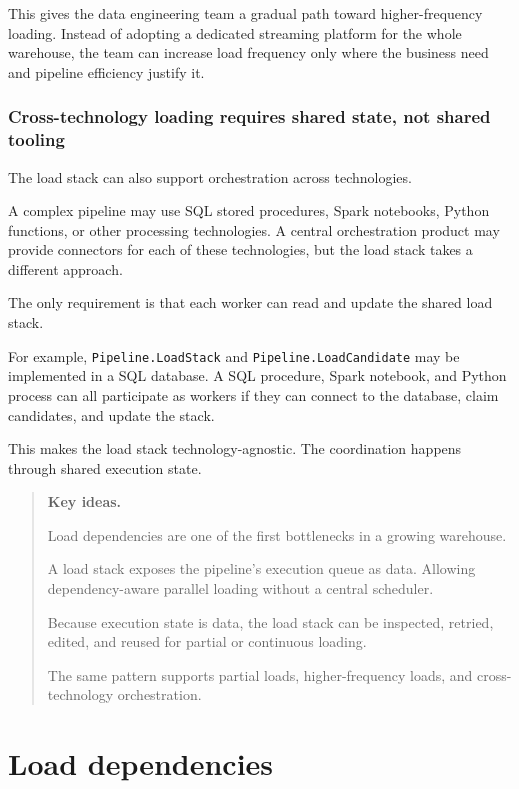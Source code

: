 \documentclass[10pt,openany,10pt]{book}
\begin{document}
This gives the data engineering team a gradual path toward
higher-frequency loading. Instead of adopting a dedicated streaming
platform for the whole warehouse, the team can increase load frequency
only where the business need and pipeline efficiency justify it.

\subsection{Cross-technology loading requires shared state, not shared
tooling}\label{cross-technology-loading-requires-shared-state-not-shared-tooling}

The load stack can also support orchestration across technologies.

A complex pipeline may use SQL stored procedures, Spark notebooks,
Python functions, or other processing technologies. A central
orchestration product may provide connectors for each of these
technologies, but the load stack takes a different approach.

The only requirement is that each worker can read and update the shared
load stack.

For example, \texttt{Pipeline.LoadStack} and
\texttt{Pipeline.LoadCandidate} may be implemented in a SQL database. A
SQL procedure, Spark notebook, and Python process can all participate as
workers if they can connect to the database, claim candidates, and
update the stack.

This makes the load stack technology-agnostic. The coordination happens
through shared execution state.

\begin{quote}
\textbf{Key ideas.}

Load dependencies are one of the first bottlenecks in a growing
warehouse.

A load stack exposes the pipeline's execution queue as data. Allowing
dependency-aware parallel loading without a central scheduler.

Because execution state is data, the load stack can be inspected,
retried, edited, and reused for partial or continuous loading.

The same pattern supports partial loads, higher-frequency loads, and
cross-technology orchestration.
\end{quote}

\newpage

\chapter{Load
dependencies}\label{docs-efficient-stable-pipeline-load-dependencies}
\end{document}

